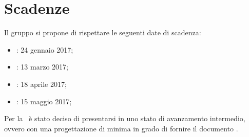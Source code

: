 \newpage
\section{Scadenze}
Il gruppo \textit{\gruppo} si propone di rispettare le seguenti date di scadenza:
\begin{itemize}
	\item \textbf{\RR}: 24 gennaio 2017;
	\item \textbf{\RP}: 13 marzo 2017;
	\item \textbf{\RQ}: 18 aprile 2017;
	\item \textbf{\RA}: 15 maggio 2017;
\end{itemize}
Per la \RP\ è stato deciso di presentarsi in uno stato di avanzamento intermedio, ovvero con una progettazione di minima in grado di fornire il documento \ST.